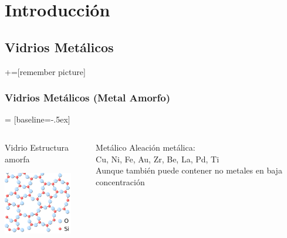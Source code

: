 
\section[Introducci\'on]{Introducci\'on}
\subsection{Vidrios Met\'alicos}

+=[remember picture]

\begin{frame}
\frametitle{Vidrios Met\'alicos (Metal Amorfo)}

 = [baseline=-.5ex]

\centering
{} 

\vspace{0.2cm}

\begin{columns}
  \begin{column}{0.48\paperwidth}
    \centering
    \begin{block}{Vidrio}
      \centering Estructura amorfa
      
      \vspace{0.2cm}
      \includegraphics[width=3cm]{../Figures/Cap_1/500px-Silica.png}
    \end{block}
  \end{column}
  \begin{column}{0.48\paperwidth}
    \centering
    \begin{block}{Met\'alico}
      \centering Aleaci\'on met\'alica:\\
      Cu, Ni, Fe, Au, Zr, Be, La, Pd, Ti\\
      
      \vspace{0.2cm}
      Aunque tambi\'en puede contener no metales en baja concentraci\'on
    \end{block}
  \end{column}
\end{columns}


\end{frame}

